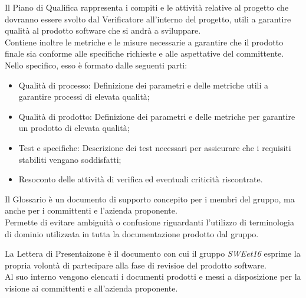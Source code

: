
    Il Piano di Qualifica rappresenta i compiti e le attività relative al progetto che dovranno essere svolto dal Verificatore all'interno del progetto,
    utili a garantire qualità al prodotto software che si andrà a sviluppare. \\
    Contiene inoltre le metriche e le misure necessarie a garantire che il prodotto finale sia conforme alle specifiche richieste e alle aspettative del committente. \\

    Nello specifico, esso è formato dalle seguenti parti:
    \begin{itemize}
        \item Qualità di processo: Definizione dei parametri e delle metriche utili a garantire processi di elevata qualità;
        \item Qualità di prodotto: Definizione dei parametri e delle metriche per garantire un prodotto di elevata qualità;
        \item Test e specifiche: Descrizione dei test necessari per assicurare che i requisiti stabiliti vengano soddisfatti;
        \item Resoconto delle attività di verifica ed eventuali criticità riscontrate.
    \end{itemize}



    Il Glossario è un documento di supporto concepito per i membri del gruppo, ma anche per i committenti e l'azienda proponente. \\
    Permette di evitare ambiguità o confusione riguardanti l'utilizzo di terminologia di dominio utilizzata in tutta la documentazione prodotto dal gruppo.



    La Lettera di Presentaizone è il documento con cui il gruppo \textit{SWEet16} esprime la propria volontà di partecipare alla fase di revisioe del prodotto software. \\
    Al suo interno vengono elencati i documenti prodotti e messi a disposizione per la visione ai committenti e all'azienda proponente.

